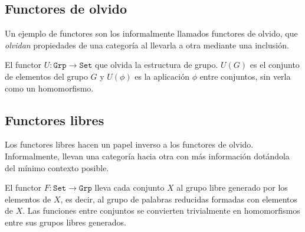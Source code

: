 \documentclass[11pt, fleqn, spanish]{book}
\begin{document}
  
  \subsection {Functores de olvido}
    Un ejemplo de functores son los informalmente llamados functores de olvido,
    que \textit{olvidan} propiedades de una categoría al llevarla a otra mediante
    una inclusión.
    
    \begin{example} El functor $U: \mathtt{Grp} \rightarrow \mathtt{Set}$ que olvida la
    estructura de grupo. $U(G)$ es el conjunto de elementos del grupo $G$ y $U(\phi)$
    es la aplicación $\phi$ entre conjuntos, sin verla como un homomorfismo.
    \end{example}
    
  \subsection {Functores libres}
    Los functores libres hacen un papel inverso a los functores de olvido.
    Informalmente, llevan una categoría hacia otra con más información dotándola del mínimo
    contexto posible.
    
    \begin{example} El functor $F: \mathtt{Set} \rightarrow \mathtt{Grp}$ lleva cada conjunto $X$
    al grupo libre generado por los elementos de $X$, es decir, al grupo de palabras
    reducidas formadas con elementos de $X$. Las funciones entre conjuntos se convierten
    trivialmente en homomorfismos entre sus grupos libres generados.
    \end{example}
\end{document}

